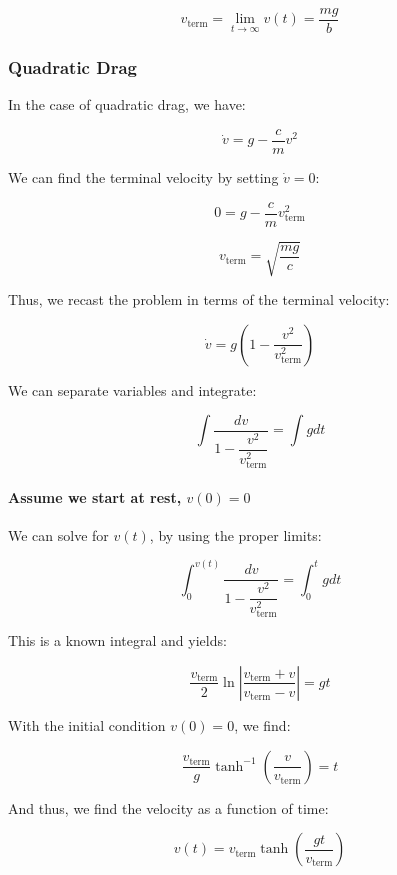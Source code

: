 \documentclass[11pt]{article}
\makeatletter
\newcommand{\boxspacing}{\kern\kvtcb@left@rule\kern\kvtcb@boxsep}
\newcommand{\prompt}[4]{
        {\ttfamily\llap{{\color{#2}[#3]:\hspace{3pt}#4}}\vspace{-\baselineskip}}
    }
\makeatother
\begin{document}
\[v_{\text{term}} = \lim_{t \to \infty} v(t) = \dfrac{mg}{b}\]

    \subsubsection{Quadratic Drag}\label{quadratic-drag}

In the case of quadratic drag, we have:

\[\dot{v} = g - \dfrac{c}{m}v^2\]

We can find the terminal velocity by setting \(\dot{v} = 0\):

\[0 = g - \dfrac{c}{m}v_{\text{term}}^2\]

\[v_{\text{term}} = \sqrt{\dfrac{mg}{c}}\]

Thus, we recast the problem in terms of the terminal velocity:

\[\dot{v} = g\left(1 - \dfrac{v^2}{v_{\text{term}}^2}\right)\]

We can separate variables and integrate:

\[\int \dfrac{dv}{1 - \dfrac{v^2}{v_{\text{term}}^2}} = \int g dt\]

\paragraph{\texorpdfstring{Assume we start at rest,
\(v(0) = 0\)}{Assume we start at rest, v(0) = 0}}\label{assume-we-start-at-rest-v0-0}

We can solve for \(v(t)\), by using the proper limits:

\[\int_{0}^{v(t)} \dfrac{dv}{1 - \dfrac{v^2}{v_{\text{term}}^2}} = \int_{0}^{t} g dt\]

This is a known integral and yields:

\[\dfrac{v_{\text{term}}}{2}\ln\left|\dfrac{v_{\text{term}} + v}{v_{\text{term}} - v}\right| = gt\]

With the initial condition \(v(0) = 0\), we find:

\[\dfrac{v_{\text{term}}}{g} \tanh^{-1}\left(\dfrac{v}{v_{\text{term}}}\right) = t\]

And thus, we find the velocity as a function of time:

\[v(t) = v_{\text{term}}\tanh\left(\dfrac{gt}{v_{\text{term}}}\right)\]

    \begin{tcolorbox}[breakable, size=fbox, boxrule=1pt, pad at break*=1mm,colback=cellbackground, colframe=cellborder]
\prompt{In}{incolor}{ }{\boxspacing}
\begin{Verbatim}[commandchars=\\\{\}]

\end{Verbatim}
\end{tcolorbox}

    


    
    
    
\end{document}
